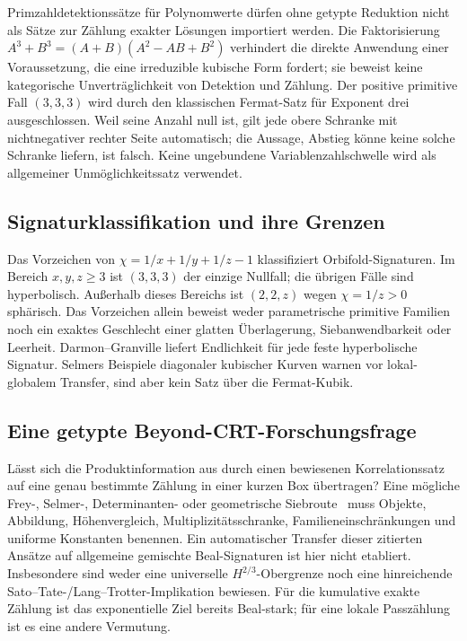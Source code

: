 \documentclass[11pt,a4paper]{article}
\begin{document}
Primzahldetektionssätze für Polynomwerte
\cite{FI1998a,FI1998b,HB2001,HBMoroz2002,Merikoski2022}
dürfen ohne getypte Reduktion nicht als Sätze zur Zählung exakter
Lösungen importiert werden. Die Faktorisierung
$A^3+B^3=(A+B)(A^2-AB+B^2)$ verhindert die direkte Anwendung
einer Voraussetzung, die eine irreduzible kubische Form fordert;
sie beweist keine kategorische Unverträglichkeit von Detektion
und Zählung.
Der positive primitive Fall $(3,3,3)$ wird durch den klassischen
Fermat-Satz für Exponent drei ausgeschlossen. Weil seine Anzahl
null ist, gilt jede obere Schranke mit nichtnegativer rechter Seite
automatisch; die Aussage, Abstieg könne keine solche Schranke
liefern, ist falsch.
Keine ungebundene Variablenzahlschwelle wird als allgemeiner
Unmöglichkeitssatz verwendet.

\subsection{Signaturklassifikation und ihre Grenzen}
\label{sec:outlook-phase}

Das Vorzeichen von $\chi=1/x+1/y+1/z-1$ klassifiziert
Orbifold-Signaturen. Im Bereich $x,y,z\ge3$ ist $(3,3,3)$
der einzige Nullfall; die übrigen Fälle sind hyperbolisch.
Außerhalb dieses Bereichs ist $(2,2,z)$ wegen $\chi=1/z>0$
sphärisch. Das Vorzeichen allein beweist weder parametrische
primitive Familien noch ein exaktes Geschlecht einer glatten
Überlagerung, Siebanwendbarkeit oder Leerheit.
Darmon--Granville liefert Endlichkeit für jede feste hyperbolische
Signatur. Selmers Beispiele diagonaler kubischer Kurven
\cite{Selmer1951} warnen vor lokal-globalem Transfer, sind aber
kein Satz über die Fermat-Kubik.

\subsection{Eine getypte Beyond-CRT-Forschungsfrage}
\label{sec:outlook-rqprime}

Lässt sich die Produktinformation aus 
durch einen bewiesenen Korrelationssatz auf eine genau bestimmte
Zählung in einer kurzen Box übertragen?
Eine mögliche Frey-, Selmer-, Determinanten- oder geometrische
Siebroute~\cite{BS2015,Bhargava2014,HeathBrown2002,KoymansSmith2024}
muss Objekte, Abbildung, Höhenvergleich, Multiplizitätsschranke,
Familieneinschränkungen und uniforme Konstanten benennen.
Ein automatischer Transfer dieser zitierten Ansätze auf allgemeine
gemischte Beal-Signaturen ist hier nicht etabliert.
Insbesondere sind weder eine universelle $H^{2/3}$-Obergrenze
noch eine hinreichende Sato--Tate-/Lang--Trotter-Implikation bewiesen.
Für die kumulative exakte Zählung ist das exponentielle Ziel
bereits Beal-stark; für eine lokale Passzählung ist es eine
andere Vermutung.
\end{document}
